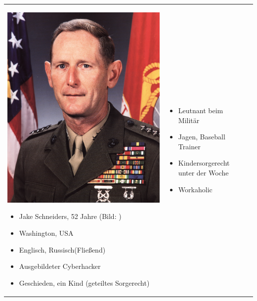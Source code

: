 \begin{center}
\begin{tabular}{| p{} | p{} | p{} |}
		\hline
		\vspace{0.3mm}
		\begin{minipage}{.2\textwidth}
			\includegraphics[width=\linewidth]{../pictures/persona2.jpg}
		\end{minipage}
		\begin{itemize}
			\item Jake Schneiders, 52 Jahre (Bild: \cite{persona2})
			\item Washington, USA
			\item Englisch, Russisch(Fließend)
			\item Ausgebildeter Cyberhacker
			\item Geschieden, ein Kind (geteiltes Sorgerecht)
		\end{itemize}
		&
		\begin{itemize}
			\item Leutnant beim Militär
			\item Jagen, Baseball Trainer
			\item Kindersorgerecht unter der Woche
			\item Workaholic

\end{itemize}
\end{tabular}
\end{center}

